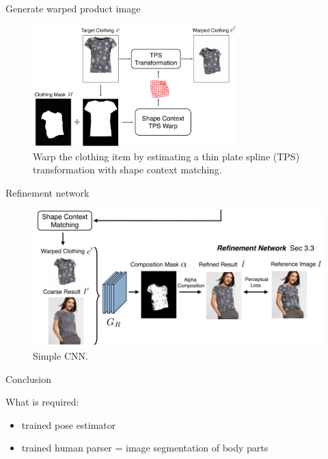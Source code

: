 \documentclass{beamer}
\begin{document}
\begin{frame}{Generate warped product image}

\begin{figure}[h]
\includegraphics[width=0.7\textwidth]{img/warp}
\caption{Warp the clothing item by estimating a thin plate spline (TPS) transformation with shape context matching.}
\end{figure}

\end{frame}
\begin{frame}{Refinement network}

\begin{figure}[h]
\includegraphics[width=\textwidth]{img/refine}
\caption{Simple CNN.}
\end{figure}

\end{frame}
\begin{frame}{Conclusion}

What is required:
\begin{itemize}
\item trained pose estimator
\item trained human parser = image segmentation of body parts
\end{itemize}

\end{frame}
\end{document}
